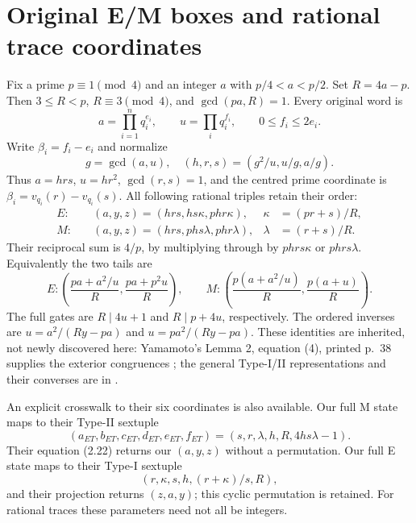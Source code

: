 \section{Original E/M boxes and rational trace coordinates}\label{sec:source}
Fix a prime $p\equiv1\pmod4$ and an integer $a$ with $p/4<a<p/2$.
Set $R=4a-p$. Then $3\le R<p$, $R\equiv3\pmod4$, and
$\gcd(pa,R)=1$. Every original word is
\[
 a=\prod_{i=1}^n q_i^{e_i},\qquad
 u=\prod_iq_i^{f_i},\qquad0\le f_i\le2e_i.
\]
Write $\beta_i=f_i-e_i$ and normalize
\[
 g=\gcd(a,u),\quad(h,r,s)=(g^2/u,u/g,a/g).
\]
Thus $a=hrs$, $u=hr^2$, $\gcd(r,s)=1$, and the centred prime coordinate is
$\beta_i=v_{q_i}(r)-v_{q_i}(s)$. All following rational triples retain their
order:
\begin{align}
 E:\quad &(a,y,z)=(hrs,hs\kappa,phr\kappa),&
 \kappa&=(pr+s)/R,\label{eq:E}\\
 M:\quad &(a,y,z)=(hrs,phs\lambda,phr\lambda),&
 \lambda&=(r+s)/R.\label{eq:M}
\end{align}
Their reciprocal sum is $4/p$, by multiplying through by $phrs\kappa$ or
$phrs\lambda$. Equivalently the two tails are
\[
 E:\left(\frac{pa+a^2/u}{R},\frac{pa+p^2u}{R}\right),\qquad
 M:\left(\frac{p(a+a^2/u)}{R},\frac{p(a+u)}R\right).
\]
The full gates are $R\mid4u+1$ and $R\mid p+4u$, respectively. The ordered
inverses are $u=a^2/(Ry-pa)$ and $u=pa^2/(Ry-pa)$.
These identities are inherited, not newly discovered here: Yamamoto's
Lemma 2, equation (4), printed p.~38 supplies the exterior congruences
\citep{Yamamoto}; the general Type-I/II representations and their converses
are in \citet[\S2, Propositions 2.2 and 2.6]{ET}.

An explicit crosswalk to their six coordinates is also available. Our full M
state maps to their Type-II sextuple
\[
 (a_{ET},b_{ET},c_{ET},d_{ET},e_{ET},f_{ET})
 =(s,r,\lambda,h,R,4hs\lambda-1).
\]
Their equation (2.22) returns our $(a,y,z)$ without a permutation. Our full E
state maps to their Type-I sextuple
\[
 (r,\kappa,s,h,(r+\kappa)/s,R),
\]
and their projection returns $(z,a,y)$; this cyclic permutation is retained.
For rational traces these parameters need not all be integers.

